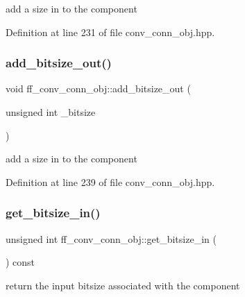 add a size in to the component 



Definition at line 231 of file conv\+\_\+conn\+\_\+obj.\+hpp.

\mbox{\label{classff__conv__conn__obj_ab4e707f811ce132263067bdeb32b6a3c}} 
\subsubsection{\texorpdfstring{add\+\_\+bitsize\+\_\+out()}{add\_bitsize\_out()}}
{\footnotesize\ttfamily void ff\+\_\+conv\+\_\+conn\+\_\+obj\+::add\+\_\+bitsize\+\_\+out (\begin{DoxyParamCaption}\item[{unsigned int}]{\+\_\+bitsize }\end{DoxyParamCaption})\hspace{0.3cm}{\ttfamily [inline]}}



add a size in to the component 



Definition at line 239 of file conv\+\_\+conn\+\_\+obj.\+hpp.

\mbox{\label{classff__conv__conn__obj_ad0fc263a81446cafb865e56c8766f67e}} 
\subsubsection{\texorpdfstring{get\+\_\+bitsize\+\_\+in()}{get\_bitsize\_in()}}
{\footnotesize\ttfamily unsigned int ff\+\_\+conv\+\_\+conn\+\_\+obj\+::get\+\_\+bitsize\+\_\+in (\begin{DoxyParamCaption}{ }\end{DoxyParamCaption}) const\hspace{0.3cm}{\ttfamily [inline]}}



return the input bitsize associated with the component 



